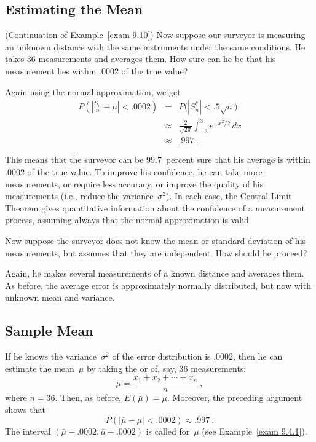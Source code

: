 \subsection*{Estimating the Mean}

\begin{example}(Continuation of Example~\ref{exam 9.10})
Now suppose our surveyor is measuring an unknown distance with the same
instruments under the same conditions.  He takes 36 measurements and averages
them.  How sure can he be that his measurement lies within .0002 of the true
value?

Again using the normal approximation, we get
\begin{eqnarray*}
P\left(\left|\frac {S_n}n - \mu\right| < .0002 \right) &=& P\bigl(|S_n^*| < .5\sqrt n\bigr) \\
     &\approx& \frac 2{\sqrt{2\pi}} \int_{-3}^3 e^{-x^2/2}\, dx \\
     &\approx& .997\ .
\end{eqnarray*}


This means that the surveyor can be 99.7~percent sure that his average is within
.0002 of the true value.  To improve his confidence, he can take more
measurements, or require less accuracy, or improve the quality of his
measurements (i.e., reduce the variance~$\sigma^2$).  In each case, the Central
Limit Theorem gives quantitative information about the confidence of a
measurement process, assuming always that the normal approximation is valid.
\par
Now suppose the surveyor does not know the mean or standard deviation of his
measurements, but assumes that they are independent.  How should he proceed?
\par
Again, he makes several measurements of a known distance and averages them.  As
before, the average error is approximately normally distributed, but now with
unknown mean and variance.
\end{example}
\subsection*{Sample Mean}
If he knows the variance~$\sigma^2$ of the error distribution is .0002, then he
can estimate the mean~$\mu$ by taking the  or 
of, say, 36 measurements:
$$
\bar \mu = \frac {x_1 + x_2 +\cdots+ x_n}n\ ,
$$
where  $n = 36$.
Then, as before, $E(\bar \mu) = \mu$.  Moreover, the preceding
argument shows that
$$
P(|\bar \mu - \mu| < .0002) \approx .997\ .
$$
The interval $(\bar \mu - .0002, \bar \mu
+ .0002)$ is called  for~$\mu$ (see
Example~\ref{exam 9.4.1}).

